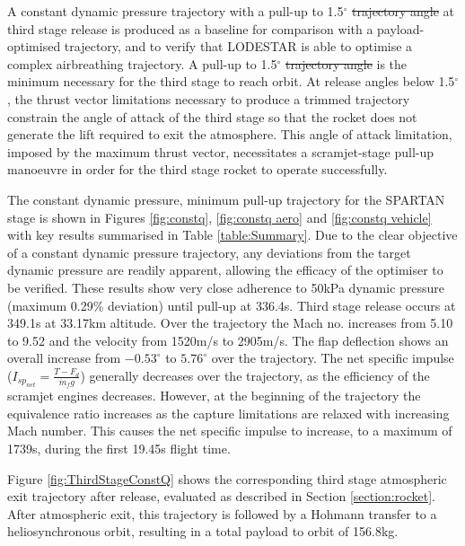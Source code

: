 \documentclass[journal]{new-aiaa}
\newcommand{\PayloadToOrbitConstq}{156.8}
\newcommand{\SeparationAltConstq}{33.17}
\newcommand{\SeparationvConstq}{2905}
\newcommand{\FlightTimeConstq}{349.1}
\providecommand{\DIFadd}[1]{{\protect\color{blue}\uwave{#1}}} %
\providecommand{\DIFdel}[1]{{\protect\color{red}\sout{#1}}}                      %
\providecommand{\DIFaddbegin}{} %
\providecommand{\DIFaddend}{} %
\providecommand{\DIFdelbegin}{} %
\providecommand{\DIFdelend}{} %
\newcommand{\DIFscaledelfig}{0.5}
\newlength{\DIFdelgraphicswidth} %
\newlength{\DIFdelgraphicsheight} %
\newcommand{\DIFaddincludegraphics}[2][]{{\color{blue}\fbox{\DIFOincludegraphics[#1]{#2}}}} %
\newcommand{\DIFdelincludegraphics}[2][]{%
\sbox{\DIFdelgraphicsbox}{\DIFOincludegraphics[#1]{#2}}%
\settoboxwidth{\DIFdelgraphicswidth}{\DIFdelgraphicsbox} %
\settoboxtotalheight{\DIFdelgraphicsheight}{\DIFdelgraphicsbox} %
\scalebox{\DIFscaledelfig}{%
\parbox[b]{\DIFdelgraphicswidth}{\usebox{\DIFdelgraphicsbox}\\[-\baselineskip] \rule{\DIFdelgraphicswidth}{0em}}\llap{\resizebox{\DIFdelgraphicswidth}{\DIFdelgraphicsheight}{%
\setlength{\unitlength}{\DIFdelgraphicswidth}%
\begin{picture}(1,1)%
\thicklines\linethickness{2pt} %
{\color[rgb]{1,0,0}\put(0,0){\framebox(1,1){}}}%
{\color[rgb]{1,0,0}\put(0,0){\line( 1,1){1}}}%
{\color[rgb]{1,0,0}\put(0,1){\line(1,-1){1}}}%
\end{picture}%
}\hspace*{3pt}}} %
} %
\DeclareRobustCommand{\DIFaddbegin}{\DIFOaddbegin \let\includegraphics\DIFaddincludegraphics} %
\DeclareRobustCommand{\DIFaddend}{\DIFOaddend \let\includegraphics\DIFOincludegraphics} %
\DeclareRobustCommand{\DIFdelbegin}{\DIFOdelbegin \let\includegraphics\DIFdelincludegraphics} %
\DeclareRobustCommand{\DIFdelend}{\DIFOaddend \let\includegraphics\DIFOincludegraphics} %
\begin{document}
A constant dynamic pressure trajectory with a pull-up to 1.5$^\circ$ \DIFdelbegin \DIFdel{trajectory angle }\DIFdelend \DIFaddbegin \DIFadd{\textcolor{red}{flight path angle} }\DIFaddend at third stage release is produced as a baseline for comparison with a payload-optimised trajectory, and to verify that LODESTAR is able to optimise a complex airbreathing trajectory. A pull-up to 1.5$^\circ$ \DIFdelbegin \DIFdel{trajectory angle }\DIFdelend \DIFaddbegin \DIFadd{\textcolor{red}{flight path angle} }\DIFaddend is the minimum necessary for the third stage to reach orbit. At release angles below 1.5$^\circ$, the thrust vector limitations necessary to produce a trimmed trajectory constrain the angle of attack of the third stage so that the rocket does not generate the lift required to exit the atmosphere. This angle of attack limitation, imposed by the maximum thrust vector, necessitates a scramjet-stage pull-up manoeuvre in order for the third stage rocket to operate successfully. 


 The constant dynamic pressure, minimum pull-up trajectory for the SPARTAN stage is shown in Figures \ref{fig:constq}, \ref{fig:constq aero} and \ref{fig:constq vehicle} with key results summarised in Table \ref{table:Summary}. Due to the clear objective of a constant dynamic pressure trajectory, any deviations from the target dynamic pressure are readily apparent, allowing the efficacy of the optimiser to be verified. 
 These results show very close adherence to 50kPa dynamic pressure (maximum 0.29\% deviation) until pull-up at 336.4s. Third stage release occurs at \FlightTimeConstq s at \SeparationAltConstq km altitude. 
 Over the trajectory the Mach no. increases from 5.10 to 9.52 and the velocity from 1520m/s to \SeparationvConstq m/s. The flap deflection shows an overall increase from $-0.53^\circ$ to $5.76^\circ$ over the trajectory.  The net specific impulse (\DIFdelbegin \DIFdel{$I_{sp_{net}} = \frac{T-F_d}{\dot{m}_f g}$}\DIFdelend \DIFaddbegin \DIFadd{$I_{sp_{net}} = \frac{T-\textcolor{red}{D}}{\dot{m}_f g}$}\DIFaddend ) generally decreases over the trajectory, as the efficiency of the scramjet engines decreases. However, at the beginning of the trajectory the equivalence ratio increases as the capture limitations are relaxed with increasing Mach number. This causes the net specific impulse to increase, to a maximum of 1739s, during the first 19.45s flight time. 

Figure \ref{fig:ThirdStageConstQ} shows the corresponding third stage atmospheric exit trajectory after release, evaluated as described in Section \ref{section:rocket}. After atmospheric exit, this trajectory is followed by a Hohmann transfer to a heliosynchronous orbit, resulting in a total payload to orbit of \PayloadToOrbitConstq kg.
\end{document}
